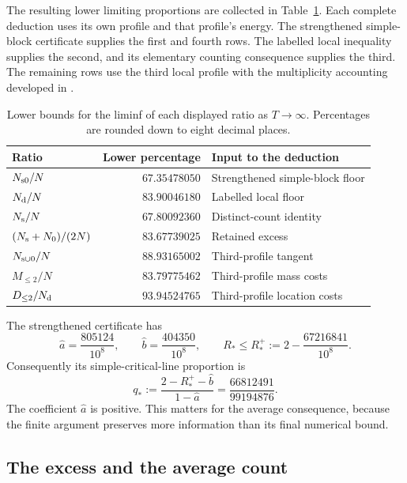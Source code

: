 \documentclass[11pt,reqno]{amsart}
\numberwithin{equation}{section}
\begin{document}
The resulting lower limiting proportions are collected in
Table~\ref{tab:plus-counts}. Each complete deduction uses its own
profile and that profile's energy. The strengthened simple-block
certificate supplies the first and fourth rows. The labelled local
inequality supplies the second, and its elementary counting consequence
supplies the third. The remaining rows use the third local profile
with the multiplicity accounting developed in
\cite{Lamzouri,ChandruP6,Knausgard2026}.

\begin{table}[htbp]
\centering\small
\caption{Lower bounds for the liminf of each displayed ratio as
$T\to\infty$. Percentages are rounded down to eight decimal places.}
\label{tab:plus-counts}
\begin{tabular}{lrl}
\toprule
Ratio & Lower percentage & Input to the deduction\\
\midrule
$N_{\rm s0}/N$ & $67.35478050$ & Strengthened simple-block floor\\
$N_{\rm d}/N$ & $83.90046180$ & Labelled local floor\\
$N_{\rm s}/N$ & $67.80092360$ & Distinct-count identity\\
$(N_{\rm s}+N_0)/(2N)$ & $83.67739025$ & Retained excess\\
$N_{\rm s\cup0}/N$ & $88.93165002$ & Third-profile tangent\\
$M_{\le2}/N$ & $83.79775462$ & Third-profile mass costs\\
$D_{\le2}/N_{\rm d}$ & $93.94524765$ & Third-profile location costs\\
\bottomrule
\end{tabular}
\end{table}

The strengthened certificate has
\begin{equation}
 \widehat a=\frac{805124}{10^8},\qquad
 \widehat b=\frac{404350}{10^8},\qquad
 R_*\le R_*^+:=2-\frac{67216841}{10^8}.
 \label{eq:plus-main-count-data}
\end{equation}
Consequently its simple-critical-line proportion is
\begin{equation}
 q_*:=\frac{2-R_*^+-\widehat b}{1-\widehat a}
 =\frac{66812491}{99194876}.
 \label{eq:plus-main-count}
\end{equation}
The coefficient $\widehat a$ is positive. This matters for the
average consequence, because the finite argument preserves more
information than its final numerical bound.

\subsection{The excess and the average count}
\end{document}

